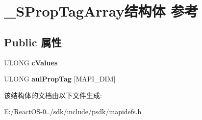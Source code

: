 \hypertarget{struct___s_prop_tag_array}{}\section{\+\_\+\+S\+Prop\+Tag\+Array结构体 参考}
\label{struct___s_prop_tag_array}
\subsection*{Public 属性}
\begin{DoxyCompactItemize}
\item 
\mbox{\label{struct___s_prop_tag_array_ac5d1bf3c9f529a2dc2fac3eff7c997e6}} 
U\+L\+O\+NG {\bfseries c\+Values}
\item 
\mbox{\label{struct___s_prop_tag_array_a30edf1aceb3f813fcf1c52642cf4be81}} 
U\+L\+O\+NG {\bfseries aul\+Prop\+Tag} \mbox{[}M\+A\+P\+I\+\_\+\+D\+IM\mbox{]}
\end{DoxyCompactItemize}


该结构体的文档由以下文件生成\+:\begin{DoxyCompactItemize}
\item 
E\+:/\+React\+O\+S-\/0../sdk/include/psdk/mapidefs.\+h\end{DoxyCompactItemize}
